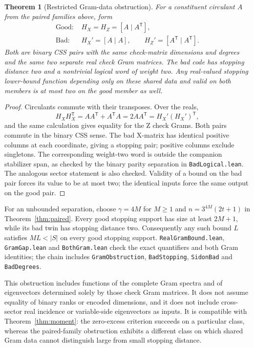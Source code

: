 \documentclass[11pt]{article}
\newtheorem{theorem}{Theorem}
\begin{document}
\begin{theorem}[Restricted Gram-data obstruction]\label{thm:gram}
For a constituent circulant $A$ from the paired families above, form
\[
 \begin{aligned}
 \text{Good: }& H_X=H_Z=[A\mid A^{\mathsf T}],\\
 \text{Bad: }& H_X'=[A\mid A],\qquad H_Z'=[A^{\mathsf T}\mid A^{\mathsf T}].
 \end{aligned}
\]
Both are binary CSS pairs with the same check-matrix dimensions and degrees
and the same two separate real check Gram matrices. The bad code has stopping
distance two and a nontrivial logical word of weight two. Any real-valued
stopping lower-bound function depending only on these shared data and valid
on both members is at most two on the good member as well.
\end{theorem}
\begin{proof}
Circulants commute with their transposes. Over the reals,
\[
 H_XH_X^{\mathsf T}=AA^{\mathsf T}+A^{\mathsf T}A
                   =2AA^{\mathsf T}=H_X'(H_X')^{\mathsf T},
\]
and the same calculation gives equality for the Z check Grams. Both pairs
commute in the binary CSS sense. The bad X-matrix has identical positive
columns at each coordinate, giving a stopping pair; positive columns exclude
singletons. The corresponding weight-two word is outside the companion
stabilizer span, as checked by the binary parity separation in
\texttt{BadLogical.lean}. The analogous sector statement is also checked.
Validity of a bound on the bad pair forces its value to be at most two;
the identical inputs force the same output on the good pair.
\end{proof}

For an unbounded separation, choose $\gamma=4M$ for $M\ge1$ and
$n=3^{4M}(2t+1)$ in Theorem~\ref{thm:paired}. Every good stopping support
has size at least $2M+1$, while its bad twin has stopping distance two.
Consequently any such bound $L$ satisfies $ML<|S|$ on every good stopping
support. \texttt{RealGramBound.lean}, \texttt{GramGap.lean} and
\texttt{BothGram.lean} check the exact quantifiers and both Gram identities;
the chain includes \texttt{GramObstruction}, \texttt{BadStopping},
\texttt{SidonBad} and \texttt{BadDegrees}.

This obstruction includes functions of the complete Gram spectra and of
eigenvectors determined solely by those check Gram matrices. It does not
assume equality of binary ranks or encoded dimensions, and it does not include
cross-sector real incidence or variable-side eigenvectors as inputs.
It is compatible with Theorem~\ref{thm:moment}: the zero-excess criterion succeeds
on a particular class, whereas the paired-family obstruction exhibits a
different class on which shared Gram data cannot distinguish large from small
stopping distance.
\end{document}
